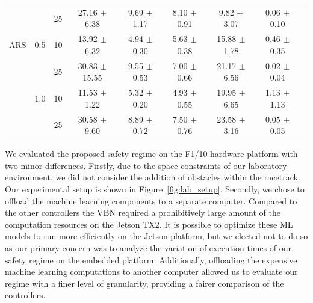 \documentclass[manuscript,screen,review]{acmart}
\newcommand{\ttj}[1]{\textcolor{red}{\textbf{\underline{TTJ:}} #1}}
\newcommand{\figref}[1]{Figure~\ref{#1}}
\begin{document}
\begin{table}[ht]
{\begin{tabular}{ccccccccc}
    &     & 25 &  27.16 $\pm$   6.38 &    9.69 $\pm$  1.17 &           8.10 $\pm$  0.91 &     9.82 $\pm$  3.07 &                    0.06 $\pm$  0.10 \\
ARS & 0.5 & 10 &  13.92 $\pm$   6.32 &    4.94 $\pm$  0.30 &           5.63 $\pm$  0.38 &    15.88 $\pm$  1.78 &                    0.46 $\pm$  0.35 \\
    &     & 25 &  30.83 $\pm$  15.55 &    9.55 $\pm$  0.53 &           7.00 $\pm$  0.66 &    21.17 $\pm$  6.56 &                    0.02 $\pm$  0.04 \\
    & 1.0 & 10 &  11.53 $\pm$   1.22 &    5.32 $\pm$  0.20 &           4.93 $\pm$  0.55 &    19.95 $\pm$  6.65 &                    1.13 $\pm$  1.13 \\
    &     & 25 &  30.58 $\pm$   9.60 &    8.89 $\pm$  0.72 &           7.50 $\pm$  0.76 &    23.58 $\pm$  3.16 &                    0.05 $\pm$  0.05 \\
\end{tabular}}%
\end{table}


We evaluated the proposed safety regime on the F1/10 hardware platform with two minor differences. Firstly, due to the space constraints of our laboratory environment, we did not consider the addition of obstacles within the racetrack. Our experimental setup is shown in \figref{fig:lab_setup}. Secondly, we chose to offload the machine learning components to a separate computer. Compared to the other controllers the VBN required a prohibitively large amount of the computation resources on the Jetson TX2. It is possible to optimize these ML models to run more efficiently on the Jetson platform, but we elected not to do so as our primary concern was to analyze the variation of execution times of our safety regime on the embedded platform. Additionally, offloading the expensive machine learning computations to another computer allowed us to evaluate our regime with a finer level of granularity, providing a fairer comparison of the controllers.








\end{document}
